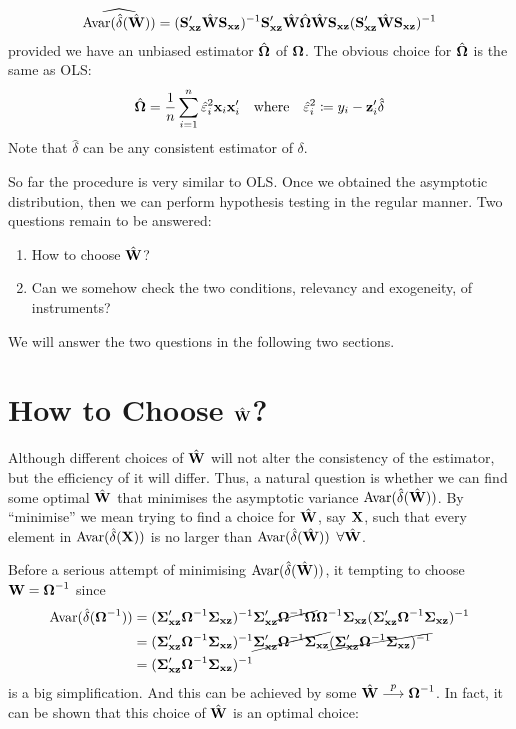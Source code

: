 \documentclass{article}
\begin{document}
\begin{align*}
	\widehat{\mathrm{Avar}(\hat{\delta}(\hat{\mathbf{W}}))}
	= (\mathbf{S}_{\mathbf{x}\mathbf{z}}'\hat{\mathbf{W}}\mathbf{S}_{\mathbf{x}\mathbf{z}})^{-1}\mathbf{S}_{\mathbf{x}\mathbf{z}}'\hat{\mathbf{W}}
	\hat{\boldsymbol{\Omega}}
	\hat{\mathbf{W}}\mathbf{S}_{\mathbf{x}\mathbf{z}}(\mathbf{S}_{\mathbf{x}\mathbf{z}}'\hat{\mathbf{W}}\mathbf{S}_{\mathbf{x}\mathbf{z}})^{-1}
\end{align*}
provided we have an unbiased estimator $\hat{\boldsymbol{\Omega}}$ of $\boldsymbol{\Omega}$.
The obvious choice for $\hat{\boldsymbol{\Omega}}$ is the same as OLS:
\begin{align*} %
	\hat{\OMEGA} = \frac1n \sum_{i=1}^{n}\hat{\varepsilon}_i^2\xx_i\xx_i'
	\quad\text{where}\quad
	\hat{\varepsilon}_i^2 \coloneqq y_i - \zz_i'\hat{\delta}
\end{align*}
Note that $\hat{\delta}$ can be any consistent estimator of $\delta$.

So far the procedure is very similar to OLS.
Once we obtained the asymptotic distribution,
then we can perform hypothesis testing in the regular manner.
Two questions remain to be answered:
\begin{enumerate}[label = (\roman*)]
	\item How to choose $\hat{\mathbf{W}}$?
	\item Can we somehow check the two conditions, relevancy and exogeneity, of instruments?
\end{enumerate}
We will answer the two questions in the following two sections.

\section{How to Choose $\hat{\mathbf{W}}$?}

Although different choices of $\hat{\mathbf{W}}$ will not alter the consistency of the estimator,
but the efficiency of it will differ.
Thus, a natural question is whether we can find some optimal $\hat{\mathbf{W}}$ that minimises the asymptotic
variance $\mathrm{Avar}(\hat{\delta}(\hat{\mathbf{W}}))$.
By ``minimise'' we mean trying to find a choice for $\hat{\mathbf{W}}$, say $\mathbf{X}$, such that every element in
$\mathrm{Avar}(\hat{\delta}(\mathbf{X}))$ is no larger than $\mathrm{Avar}(\hat{\delta}(\hat{\mathbf{W}}))$ $\forall\hat{\mathbf{W}}$.

Before a serious attempt of minimising $\mathrm{Avar}(\hat{\delta}(\hat{\mathbf{W}}))$,
it tempting to choose $\mathbf{W}=\boldsymbol{\Omega}^{-1}$ since
\begin{align*}
	\mathrm{Avar}(\hat{\delta}(\boldsymbol{\Omega}^{-1}))
	&= (\boldsymbol{\Sigma}_{\mathbf{x}\mathbf{z}}'\boldsymbol{\Omega}^{-1}\boldsymbol{\Sigma}_{\mathbf{x}\mathbf{z}})^{-1}
	\boldsymbol{\Sigma}_{\mathbf{x}\mathbf{z}}'\cancel{\boldsymbol{\Omega}^{-1}\boldsymbol{\Omega}}\boldsymbol{\Omega}^{-1}\boldsymbol{\Sigma}_{\mathbf{x}\mathbf{z}}
	(\boldsymbol{\Sigma}_{\mathbf{x}\mathbf{z}}'\boldsymbol{\Omega}^{-1}\boldsymbol{\Sigma}_{\mathbf{x}\mathbf{z}})^{-1} \\
	&= (\boldsymbol{\Sigma}_{\mathbf{x}\mathbf{z}}'\boldsymbol{\Omega}^{-1}\boldsymbol{\Sigma}_{\mathbf{x}\mathbf{z}})^{-1}
	\cancel{\boldsymbol{\Sigma}_{\mathbf{x}\mathbf{z}}'\boldsymbol{\Omega}^{-1}\boldsymbol{\Sigma}_{\mathbf{x}\mathbf{z}}}
	\cancel{(\boldsymbol{\Sigma}_{\mathbf{x}\mathbf{z}}'\boldsymbol{\Omega}^{-1}\boldsymbol{\Sigma}_{\mathbf{x}\mathbf{z}})^{-1}} \\
	&= (\boldsymbol{\Sigma}_{\mathbf{x}\mathbf{z}}'\boldsymbol{\Omega}^{-1}\boldsymbol{\Sigma}_{\mathbf{x}\mathbf{z}})^{-1}
\end{align*}
is a big simplification. And this can be achieved by some $\hat{\mathbf{W}}\overset{p}{\longrightarrow}\boldsymbol{\Omega}^{-1}$.
In fact, it can be shown that this choice of $\hat{\mathbf{W}}$ is an optimal choice:
\end{document}
